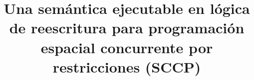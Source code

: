 \title{Una sem\'antica ejecutable en l\'ogica de reescritura para programaci\'on espacial concurrente por restricciones (SCCP)}
